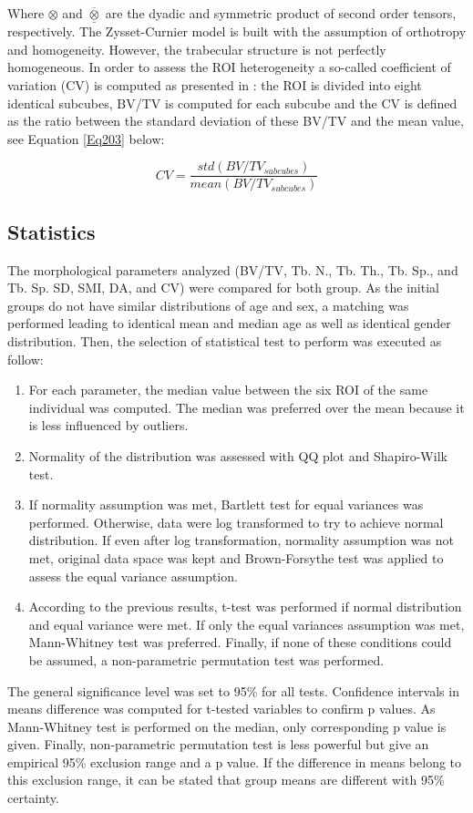 \documentclass[a4paper,fleqn]{DC_ArtStyle}
\begin{document}
Where $\otimes$ and $\overline{\underline{\otimes}}$ are the dyadic and symmetric product of second order tensors, respectively. The Zysset-Curnier model is built with the assumption of orthotropy and homogeneity. However, the trabecular structure is not perfectly homogeneous. In order to assess the ROI heterogeneity a so-called coefficient of variation (CV) is computed as presented in \cite{Panyasantisuk2015}: the ROI is divided into eight identical subcubes, BV/TV is computed for each subcube and the CV is defined as the ratio between the standard deviation of these BV/TV and the mean value, see Equation \ref{Eq203} below:

\begin{equation}
	CV = \frac{std(BV/TV_{subcubes})}{mean(BV/TV_{subcubes})}
	\label{Eq203}
\end{equation}

\subsection{Statistics}
The morphological parameters analyzed (BV/TV, Tb. N., Tb. Th., Tb. Sp., and Tb. Sp. SD, SMI, DA, and CV) were compared for both group. As the initial groups do not have similar distributions of age and sex, a matching was performed leading to identical mean and median age as well as identical gender distribution. Then, the selection of statistical test to perform was executed as follow:
\begin{enumerate}
	\item For each parameter, the median value between the six ROI of the same individual was computed. The median was preferred over the mean because it is less influenced by outliers.
	\item Normality of the distribution was assessed with QQ plot and Shapiro-Wilk test.
	\item If normality assumption was met, Bartlett test for equal variances was performed. Otherwise, data were log transformed to try to achieve normal distribution. If even after log transformation, normality assumption was not met, original data space was kept and Brown-Forsythe test was applied to assess the equal variance assumption.
	\item According to the previous results, t-test was performed if normal distribution and equal variance were met. If only the equal variances assumption was met, Mann-Whitney test was preferred. Finally, if none of these conditions could be assumed, a non-parametric permutation test was performed.
\end{enumerate}
The general significance level was set to 95\% for all tests. Confidence intervals in means difference was computed for t-tested variables to confirm p values. As Mann-Whitney test is performed on the median, only corresponding p value is given. Finally, non-parametric permutation test is less powerful but give an empirical 95\% exclusion range and a p value. If the difference in means belong to this exclusion range, it can be stated that group means are different with 95\% certainty.
\end{document}
